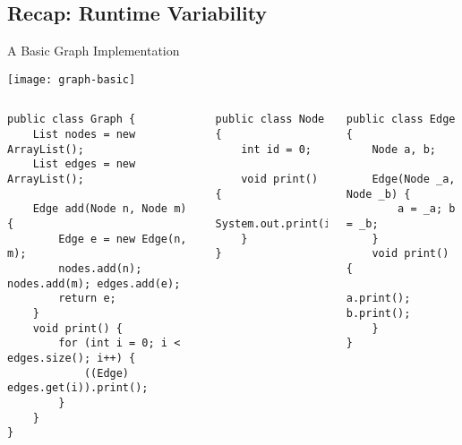 \subsection{Recap: Runtime Variability}
\begin{frame}{\insertsubsection}
\end{frame}

\begin{frame}[fragile]{A Basic Graph Implementation}
	\vspace{-1.5cm}
	\begin{flushright}
		\texttt{[image: graph-basic]}
	\end{flushright}
	\vspace{0.1cm}
	\begin{tiny}
		\begin{columns}
\begin{lstlisting}
public class Graph {
	List nodes = new ArrayList();
	List edges = new ArrayList();

	Edge add(Node n, Node m) {
		Edge e = new Edge(n, m);
		nodes.add(n); nodes.add(m); edges.add(e);
		return e;
	}
	void print() {
		for (int i = 0; i < edges.size(); i++) {
			((Edge) edges.get(i)).print();
		}
	}
}
\end{lstlisting}
\begin{lstlisting}
public class Node {
	int id = 0;

	void print() {
		System.out.print(id);
	}
}
\end{lstlisting}
\begin{lstlisting}
public class Edge {
	Node a, b;

	Edge(Node _a, Node _b) {
		a = _a; b = _b;
	}
	void print() {
		a.print(); b.print();
	}
}
\end{lstlisting}
		\end{columns}
	\end{tiny}
\end{frame}

